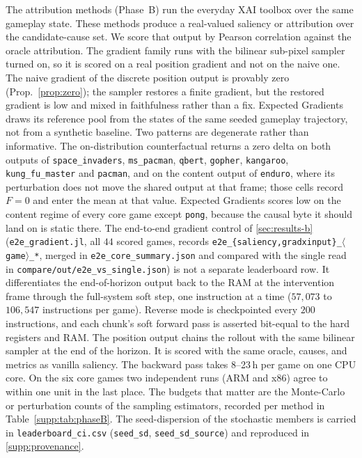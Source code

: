 The attribution methods (Phase~B) run the everyday XAI toolbox over the same gameplay state.
These methods produce a real-valued saliency or attribution over the candidate-cause set.
We score that output by Pearson correlation against the oracle attribution. The gradient family
runs with the bilinear sub-pixel sampler turned on, so it is scored on a real position gradient
and not on the naive one. The naive gradient of the discrete position output is provably zero
(Prop.~\ref{prop:zero}); the sampler restores a finite gradient, but the restored gradient is
low and mixed in faithfulness rather than a fix. Expected Gradients draws its reference pool
from the states of the same seeded gameplay trajectory, not from a synthetic baseline. Two
patterns are degenerate rather than informative. The on-distribution counterfactual returns a
zero delta on both outputs of \texttt{space\_invaders}, \texttt{ms\_pacman}, \texttt{qbert},
\texttt{gopher}, \texttt{kangaroo}, \texttt{kung\_fu\_master} and \texttt{pacman}, and on the
content output of \texttt{enduro}, where its perturbation does not move the shared output at that frame; those cells record $F=0$ and enter
the mean at that value. Expected Gradients scores low on the content regime of every core game except \texttt{pong},
because the causal byte it should land on is static there. The end-to-end gradient control of
\Sectionname\ref{sec:results-b} (\texttt{e2e\_gradient.jl}, all $44$ scored games, records
\texttt{e2e\_\{saliency,gradxinput\}\_$\langle$game$\rangle$\_*}, merged in \texttt{e2e\_core\_summary.json} and
compared with the single read in \texttt{compare/out/e2e\_vs\_single.json}) is not a
separate leaderboard row. It differentiates the end-of-horizon output back to the RAM at the
intervention frame through the full-system soft step, one instruction at a time ($57{,}073$ to
$106{,}547$ instructions per game). Reverse mode is checkpointed every $200$ instructions, and
each chunk's soft forward pass is asserted bit-equal to the hard registers and RAM. The
position output chains the rollout with the same bilinear sampler at the end of the horizon.
It is scored with the same oracle, causes, and metrics as vanilla saliency. The backward pass
takes 8--23\,h per game on one CPU core. On the six core games two independent runs (ARM and
x86) agree to within one unit in the last place. The budgets that matter are the
Monte-Carlo or perturbation counts of the sampling estimators, recorded per method in
Table~\ref{supp:tab:phaseB}. The seed-dispersion of the stochastic members is carried in
\texttt{leaderboard\_ci.csv} (\texttt{seed\_sd}, \texttt{seed\_sd\_source}) and reproduced
in \Sectionname\ref{supp:provenance}.

